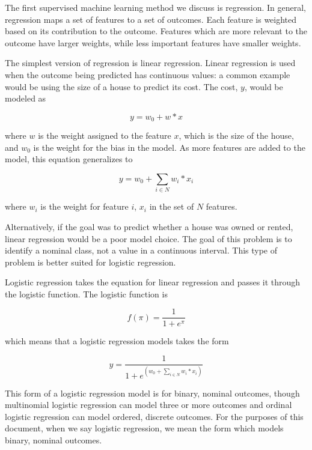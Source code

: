 The first supervised machine learning method we discuss is regression. In general, regression maps a set of features to a set of outcomes. Each feature is weighted based on its contribution to the outcome. Features which are more relevant to the outcome have larger weights, while less important features have smaller weights. 

The simplest version of regression is linear regression. Linear regression is used when the outcome being predicted has continuous values: a common example would be using the size of a house to predict its cost. The cost, $y$, would be modeled as

\begin{equation}
y = w_0 + w*x
\end{equation}

\noindent where $w$ is the weight assigned to the feature $x$, which is the size of the house, and $w_0$ is the weight for the bias in the model. As more features are added to the model, this equation generalizes to 

\begin{equation}
y = w_0 + \sum_{i \in N} w_i*x_i
\end{equation}

\noindent where $w_i$ is the weight for feature $i$, $x_i$ in the set of $N$ features. 

Alternatively, if the goal was to predict whether a house was owned or rented, linear regression would be a poor model choice. The goal of this problem is to identify a nominal class, not a value in a continuous interval. This type of problem is better suited for logistic regression.

Logistic regression takes the equation for linear regression and passes it through the logistic function. %
The logistic function is 

\begin{equation}
f(\pi) = \frac{1}{1+e^{\pi}}
\end{equation}

\noindent which means that a logistic regression models takes the form

\begin{equation}
y = \frac{1}{1+e^{(w_0 + \sum_{i \in N} w_i*x_i)}}
\end{equation}

This form of a logistic regression model is for binary, nominal outcomes, though multinomial logistic regression can model three or more outcomes and ordinal logistic regression can model ordered, discrete outcomes. For the purposes of this document, when we say logistic regression, we mean the form which models binary, nominal outcomes. 

